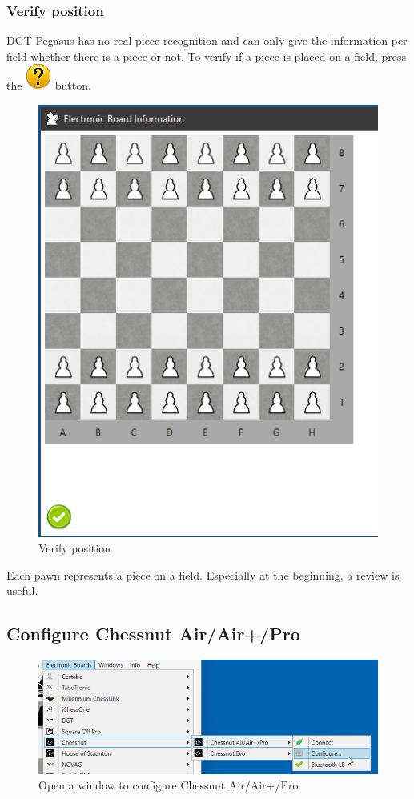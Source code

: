 \documentclass[11pt,a4paper]{article}
\begin{document}
\subsubsection{Verify position} \label{VerifyPegasusPosition}
DGT Pegasus has no real piece recognition and can only give the information per field whether there is a piece or not. To verify if a piece is placed on a field, press the  \includegraphics[scale=0.4]{emotion_question.png} button.

\begin{figure}[H]
	\centering
	\includegraphics[scale=0.8]{Pegasus5.png}
	\caption{Verify position}
	\label{fig:Pegasus5}
\end{figure}

Each pawn represents a piece on a field. Especially at the beginning, a review is useful. 

\subsection{Configure Chessnut Air/Air+/Pro} \label{ConfigureChessnutAir}
\begin{figure}[H]
	\centering
	\includegraphics[scale=0.7]{ChessnutAir5.png}
	\caption{Open a window to configure Chessnut Air/Air+/Pro}
	\label{fig:ChessnutAir5}
\end{figure}
\end{document}
